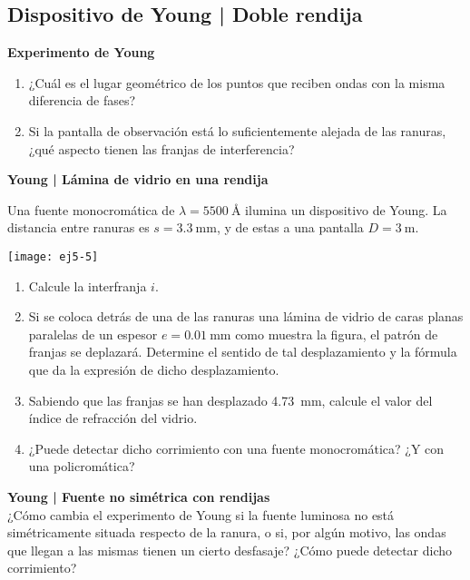 \subsection*{Dispositivo de Young | Doble rendija}

\item \textbf{Experimento de Young}
\begin{enumerate}
	\item ¿Cuál es el lugar geométrico de los puntos que reciben ondas con la misma diferencia de fases?
	\item Si la pantalla de observación está lo suficientemente alejada de las ranuras, ¿qué aspecto tienen las franjas de interferencia?
\end{enumerate}



\item \textbf{Young | Lámina de vidrio en una rendija}\\ 
\begin{minipage}[t][2cm]{0.6\textwidth}
Una fuente monocromática de $\lambda = \SI{5500}{\angstrom}$ ilumina un dispositivo de Young.
La distancia entre ranuras es $s = \SI{3.3}{\milli\metre}$, y de estas a una pantalla $D = \SI{3}{\metre}$.
\end{minipage}
\begin{minipage}[c][3cm][t]{0.35\textwidth}
	\texttt{[image: ej5-5]}
\end{minipage}
\begin{enumerate}
	\item Calcule la interfranja $i$.
	\item Si se coloca detrás de una de las ranuras una lámina de vidrio de caras planas paralelas de un espesor $e = \SI{0.01}{\milli\metre}$ como muestra la figura, el patrón de franjas se deplazará.
	Determine el sentido de tal desplazamiento y la fórmula que da la expresión de dicho desplazamiento.
	\item Sabiendo que las franjas se han desplazado \SI{4.73}{\milli\metre}, calcule el valor del índice de refracción del vidrio.
	\item ¿Puede detectar dicho corrimiento con una fuente monocromática?
	¿Y con una policromática?
\end{enumerate}



\item 
\textbf{Young | Fuente no simétrica con rendijas}\\
¿Cómo cambia el experimento de Young si la fuente luminosa no está simétricamente situada respecto de la ranura, o si, por algún motivo, las ondas que llegan a las mismas tienen un cierto desfasaje?
¿Cómo puede detectar dicho corrimiento?



